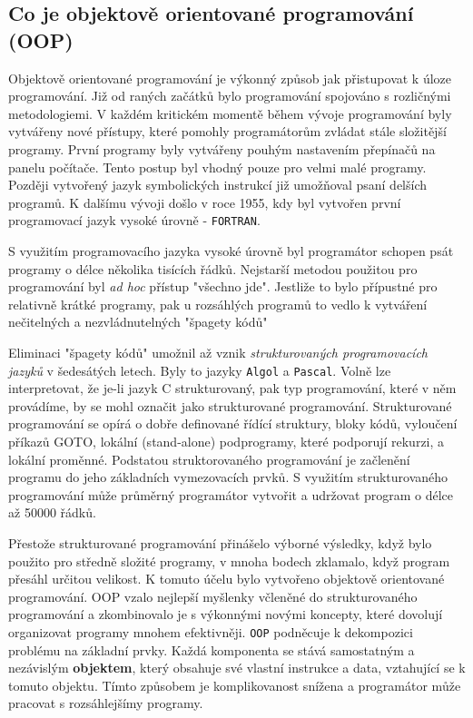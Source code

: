     \subsection{Co je objektově orientované programování (OOP)}
      Objektově orientované programování je výkonný způsob jak přistupovat k úloze programování. Již
      od raných začátků bylo programování spojováno s rozličnými metodologiemi. V každém kritickém
      momentě během vývoje programování byly vytvářeny nové přístupy, které pomohly programátorům
      zvládat stále složitější programy. První programy byly vytvářeny pouhým nastavením přepínačů
      na panelu počítače. Tento postup byl vhodný pouze pro velmi malé programy. Později vytvořený
      jazyk symbolických instrukcí již umožňoval psaní delších programů. K dalšímu vývoji došlo v
      roce 1955, kdy byl vytvořen první programovací jazyk vysoké úrovně - \texttt{FORTRAN}.
    
      S využitím programovacího jazyka vysoké úrovně byl programátor schopen psát programy o délce
      několika tisících řádků. Nejstarší metodou použitou pro programování byl \emph{ad hoc} přístup
      "všechno jde". Jestliže to bylo přípustné pro relativně krátké programy, pak u rozsáhlých
      programů to vedlo k vytváření nečitelných a nezvládnutelných "špagety kódů"
    
      Eliminaci "špagety kódů" umožnil až vznik \emph{strukturovaných programovacích jazyků} v
      šedesátých letech. Byly to jazyky \texttt{Algol} a \texttt{Pascal}. Volně lze interpretovat,
      že je-li jazyk C strukturovaný, pak typ programování, které v něm provádíme, by se mohl
      označit jako strukturované programování. Strukturované programování se opírá o dobře
      definované řídící struktury, bloky kódů, vyloučení příkazů GOTO, lokální (stand-alone)
      podprogramy, které podporují rekurzi, a lokální proměnné. Podstatou struktorovaného
      programování je začlenění programu do jeho základních vymezovacích prvků. S využitím
      strukturovaného programování může průměrný programátor vytvořit a udržovat program o délce až
      \num{50000} řádků. 
    
      Přestože strukturované programování přinášelo výborné výsledky, když bylo použito pro středně
      složité programy, v mnoha bodech zklamalo, když program přesáhl určitou velikost. K tomuto
      účelu bylo vytvořeno objektově orientované programování. OOP vzalo nejlepší myšlenky včleněné
      do strukturovaného programování a zkombinovalo je s výkonnými novými koncepty, které dovolují
      organizovat programy mnohem efektivněji. \texttt{OOP} podněcuje k dekompozici problému na
      základní prvky. Každá komponenta se stává samostatným a nezávislým \textbf{objektem}, který
      obsahuje své vlastní instrukce a data, vztahující se k tomuto objektu. Tímto způsobem je
      komplikovanost snížena a programátor může pracovat s rozsáhlejšímy programy. 
  
